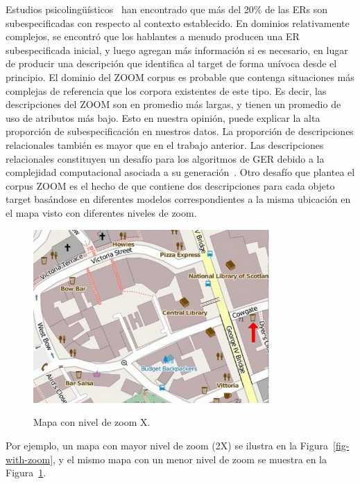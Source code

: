 Estudios psicoling\"u\'{i}sticos~\cite{Clark1986} han encontrado que m\'as del 20\% de las ERs son subespecificadas con respecto al contexto establecido. En dominios relativamente complejos, se encontr\'o que los hablantes a menudo producen una ER subespecificada inicial, y luego agregan m\'as informaci\'on si es necesario, en lugar de producir una descripci\'on que identifica al target de forma un\'{i}voca desde el principio. El dominio del ZOOM corpus es probable que contenga situaciones m\'as complejas de referencia que los corpora existentes de este tipo. Es decir, las descripciones del ZOOM son en promedio m\'as largas, y tienen un promedio de uso de atributos m\'as bajo. Esto en nuestra opini\'on, puede explicar la alta proporci\'on de subespecificaci\'on en nuestros datos. La proporci\'on de descripciones relacionales tambi\'en es mayor que en el trabajo anterior. Las descripciones relacionales constituyen un desaf\'{i}o para los algoritmos de GER debido a la complejidad computacional asociada a su generaci\'on~\cite{survey}. Otro desaf\'{i}o que plantea el corpus ZOOM es el hecho de que contiene dos descripciones para cada objeto target bas\'andose en diferentes modelos correspondientes a la misma ubicaci\'on en el mapa visto con diferentes niveles de zoom. 
\medskip
\begin{figure}[ht]
\begin{center}
\includegraphics[width=9cm]{images/imagensinzoombien.png}\\[0pt]
\caption{Mapa con nivel de zoom X.}
\label{interface2}
\end{center}
\end{figure}
Por ejemplo, un mapa con mayor nivel de zoom (2X) se ilustra en la Figura~\ref{fig-with-zoom}, y el mismo mapa con un menor nivel de zoom se muestra en la Figura~\ref{interface2}.

